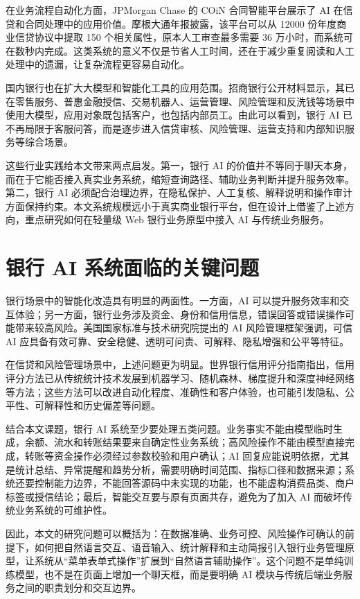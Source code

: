 \documentclass[bachelor, print]{xduthesis}
\begin{document}
在业务流程自动化方面，JPMorgan Chase 的 COiN 合同智能平台展示了 AI 在信贷和合同处理中的应用价值。摩根大通年报披露，该平台可以从 12000 份年度商业信贷协议中提取 150 个相关属性，原本人工审查最多需要 36 万小时，而系统可在数秒内完成\cite{jpmorgan2016annual}。这类系统的意义不仅是节省人工时间，还在于减少重复阅读和人工处理中的遗漏，让复杂流程更容易自动化。

国内银行也在扩大大模型和智能化工具的应用范围。招商银行公开材料显示，其已在零售服务、普惠金融授信、交易机器人、运营管理、风险管理和反洗钱等场景中使用大模型，应用对象既包括客户，也包括内部员工\cite{cmb2024annual}。由此可以看到，银行 AI 已不再局限于客服问答，而是逐步进入信贷审核、风险管理、运营支持和内部知识服务等综合场景。

这些行业实践给本文带来两点启发。第一，银行 AI 的价值并不等同于聊天本身，而在于它能否接入真实业务系统，缩短查询路径、辅助业务判断并提升服务效率。第二，银行 AI 必须配合治理边界，在隐私保护、人工复核、解释说明和操作审计方面保持约束。本文系统规模远小于真实商业银行平台，但在设计上借鉴了上述方向，重点研究如何在轻量级 Web 银行业务原型中接入 AI 与传统业务服务。

\section{银行 AI 系统面临的关键问题}

银行场景中的智能化改造具有明显的两面性。一方面，AI 可以提升服务效率和交互体验；另一方面，银行业务涉及资金、身份和信用信息，错误回答或错误操作可能带来较高风险。美国国家标准与技术研究院提出的 AI 风险管理框架强调，可信 AI 应具备有效可靠、安全稳健、透明可问责、可解释、隐私增强和公平等特征\cite{nist2023airmf}。

在信贷和风险管理场景中，上述问题更为明显。世界银行信用评分指南指出，信用评分方法已从传统统计技术发展到机器学习、随机森林、梯度提升和深度神经网络等方法；这些方法可以改进自动化程度、准确性和客户体验，也可能引发隐私、公平性、可解释性和历史偏差等问题\cite{worldbank2020creditscoring}。

结合本文课题，银行 AI 系统至少要处理五类问题。业务事实不能由模型临时生成，余额、流水和转账结果要来自确定性业务系统；高风险操作不能由模型直接完成，转账等资金操作必须经过参数校验和用户确认；AI 回复应能说明依据，尤其是统计总结、异常提醒和趋势分析，需要明确时间范围、指标口径和数据来源；系统还要控制能力边界，不能回答源码中未实现的功能，也不能虚构消费品类、商户标签或授信结论；最后，智能交互要与原有页面共存，避免为了加入 AI 而破坏传统业务系统的可维护性。

因此，本文的研究问题可以概括为：在数据准确、业务可控、风险操作可确认的前提下，如何把自然语言交互、语音输入、统计解释和主动简报引入银行业务管理原型，让系统从“菜单表单式操作”扩展到“自然语言辅助操作”。这个问题不是单纯训练模型，也不是在页面上增加一个聊天框，而是要明确 AI 模块与传统后端业务服务之间的职责划分和交互边界。
\end{document}
